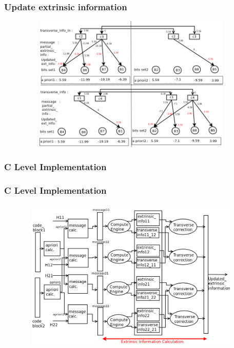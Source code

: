 \documentclass[xcolor=dvipsname]
{beamer}
\begin{document}
\begin{frame}[t]
\frametitle{ Update extrinsic information }  
\vspace{-5mm}
\begin{figure}
       \includegraphics[height=6.5cm,width=11cm]{minSumModified4}
       \end{figure}
\end{frame}


\subsubsection{C Level Implementation}


\begin{frame}[t]
\frametitle{C Level Implementation}  

\end{frame}

\begin{frame}[t]
\frametitle{  }  
\begin{figure}
       \includegraphics[height=7cm,width=11cm]{minSumModified}
       \end{figure}
\end{frame}
\end{document}
